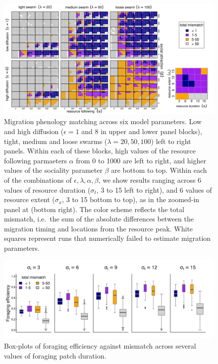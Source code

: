 \documentclass[utf8]{frontiersSCNS} %
\begin{document}
\begin{figure}
	\includegraphics[width = \textwidth]{figures/StabilityResults.png} 
	\caption{\label{fig_phenologymatching} Migration phenology matching across six model parameters. Low and high diffusion ($\epsilon = 1$ and $8$ in upper and lower panel blocks), tight, medium and loose swarms ($\lambda = 20, 50, 100$) left to right panels. Within each of these blocks, high values of the resource following parmaeters $\alpha$ from 0 to 1000 are left to right, and higher values of the sociality parameter $\beta$ are bottom to top. Within each of the combinations of $\epsilon, \lambda, \alpha, \beta$, we show results ranging across 6 values of resource duration ($\sigma_t$, 3 to 15 left to right), and 6 values of resource extent ($\sigma_x$, 3 to 15 bottom to top), as in the zoomed-in panel at (bottom right). The color scheme reflects the total mismatch, i.e.~the sum of the absolute differences between the migration timing and locations from the resource peak. White squares represent runs that numerically failed to estimate migration parameters.}
\end{figure}

\begin{figure}
	\includegraphics[width = \textwidth]{figures/ForagingEfficiency.png}
	\caption{\label{fig_boxplotFE} Box-plots of foraging efficiency against mismatch across several values of foraging patch duration.}
\end{figure}
\end{document}
